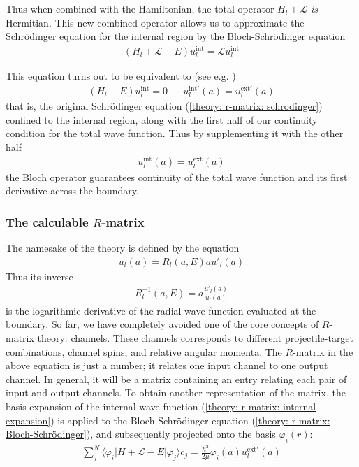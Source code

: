 Thus when combined with the Hamiltonian, the total operator $H_l + \mathcal{L}$ \textit{is} Hermitian. This new combined operator allows us to approximate the Schrödinger equation for the internal region by the Bloch-Schrödinger equation
\begin{align} \label{theory: r-matrix: Bloch-Schrödinger}
	(H_l + \mathcal{L} - E)u^{\text{int}}_l = \mathcal{L}u^{\text{int}}_l
\end{align}

This equation turns out to be equivalent to (see e.g. \cite{Baye lecture notes})
\begin{align*}
	(H_l - E)u^{\text{int}}_l = 0 && u_l^{\text{int} \prime}(a) = u_l^{\text{ext} \prime}(a)
\end{align*}
that is, the original Schrödinger equation (\ref{theory: r-matrix: schrodinger}) confined to the internal region, along with the first half of our continuity condition for the total wave function. Thus by supplementing it with the other half
\begin{align*}
	u^{\text{int}}_l(a) = u^{\text{ext}}_l(a)
\end{align*}
the Bloch operator guarantees continuity of the total wave function and its first derivative across the boundary. 

\subsubsection{The calculable $R$-matrix}
The namesake of the theory is defined by the equation
\begin{align} \label{theory: r-matrix: r-matrix}
	u_l(a) = R_l(a, E)au'_l(a)
\end{align}
Thus its inverse 
\begin{align*}
	R_l^{-1}(a, E) = a\frac{u'_l(a)}{u_l(a)}
\end{align*}
is the logarithmic derivative of the radial wave function evaluated at the boundary. So far, we have completely avoided one of the core concepts of $R$-matrix theory: channels. These channels corresponds to different projectile-target combinations, channel spins, and relative angular momenta. The $R$-matrix in the above equation is just a number; it relates one input channel to one output channel. In general, it will be a matrix containing an entry relating each pair of input and output channels. To obtain another representation of the matrix, the basis expansion of the internal wave function (\ref{theory: r-matrix: internal expansion}) is applied to the Bloch-Schrödinger equation (\ref{theory: r-matrix: Bloch-Schrödinger}), and subsequently projected onto the basis $\varphi_i(r)$:
\begin{align} \label{theory: r-matrix: r-matrix C}
	\sum_{j}^{N}\langle \varphi_i | H + \mathcal{L} - E | \varphi_j \rangle c_j = \frac{\hbar^2}{2\mu} \varphi_i(a)u^{\text{ext}\prime}_l(a)
\end{align}

